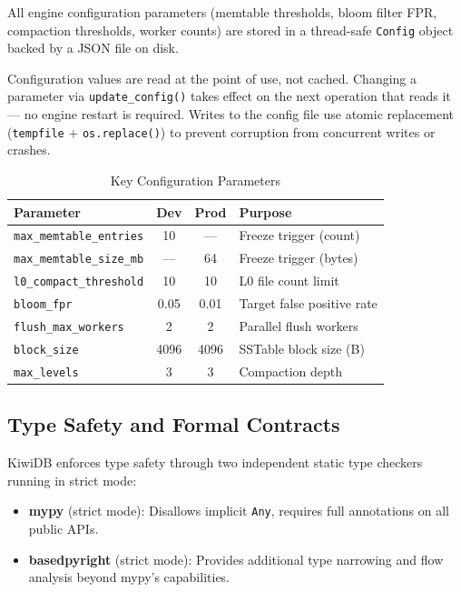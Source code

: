 \documentclass[conference]{IEEEtran}
\begin{document}
All engine configuration parameters (memtable thresholds, bloom filter FPR, compaction thresholds, worker counts) are stored in a thread-safe \texttt{Config} object backed by a JSON file on disk.

Configuration values are read at the point of use, not cached. Changing a parameter via \texttt{update\_config()} takes effect on the next operation that reads it --- no engine restart is required. Writes to the config file use atomic replacement (\texttt{tempfile} + \texttt{os.replace()}) to prevent corruption from concurrent writes or crashes.

\begin{table}[H]
\centering
\caption{Key Configuration Parameters}
\label{tab:config}
\begin{tabular}{@{}lccp{3.5cm}@{}}
\toprule
\textbf{Parameter} & \textbf{Dev} & \textbf{Prod} & \textbf{Purpose} \\
\midrule
\texttt{max\_memtable\_entries} & 10 & --- & Freeze trigger (count) \\
\texttt{max\_memtable\_size\_mb} & --- & 64 & Freeze trigger (bytes) \\
\texttt{l0\_compact\_threshold} & 10 & 10 & L0 file count limit \\
\texttt{bloom\_fpr} & 0.05 & 0.01 & Target false positive rate \\
\texttt{flush\_max\_workers} & 2 & 2 & Parallel flush workers \\
\texttt{block\_size} & 4096 & 4096 & SSTable block size (B) \\
\texttt{max\_levels} & 3 & 3 & Compaction depth \\
\bottomrule
\end{tabular}
\end{table}

\subsection{Type Safety and Formal Contracts}

KiwiDB enforces type safety through two independent static type checkers running in strict mode:

\begin{itemize}[leftmargin=*]
    \item \textbf{mypy} (strict mode): Disallows implicit \texttt{Any}, requires full annotations on all public APIs.
    \item \textbf{basedpyright} (strict mode): Provides additional type narrowing and flow analysis beyond mypy's capabilities.
\end{itemize}
\end{document}
